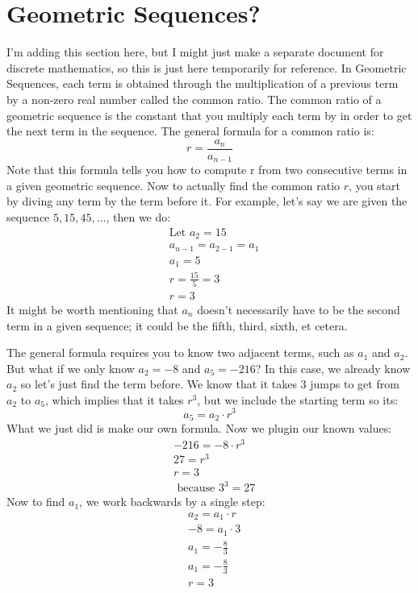 \documentclass[12pt, letterpaper]{article}
\begin{document}
	\section{Geometric Sequences?}
	I'm adding this section here, but I might just make a separate document for discrete mathematics, so this is just here temporarily for reference.
	In Geometric Sequences, each term is obtained through the multiplication of a previous term by a non-zero real number called the common ratio. The common ratio of a geometric sequence is the constant that you multiply each term by in order to get the next term in the sequence. The general formula for a common ratio is:
	\begin{equation*}
		r = \frac{a_n}{a_{n-1}}
	\end{equation*}
	Note that this formula tells you how to compute r from two consecutive terms in a given geometric sequence. Now to actually find the common ratio \(r\), you start by diving any term by the term before it. For example, let's say we are given the sequence \(5, 15, 45,...\), then we do:
	\begin{equation*}
	\begin{split}
		&\text{Let } a_{2} = 15 \\
		&a_{n-1} = a_{2-1} = a_{1} \\
		&a_{1} = 5 \\
		&r = \frac{15}{5} = 3 \\
		&r = 3
	\end{split}
	\end{equation*}
	It might be worth mentioning that \(a_n\) doesn't necessarily have to be the second term in a given sequence; it could be the fifth, third, sixth, et cetera.
	
	The general formula requires you to know two adjacent terms, such as \( a_1\) and \(a_2 \). But what if we only know \(a_2 = -8\) and \(a_5 = -216\)? In this case, we already know \(a_2\) so let's just find the term before. We know that it takes 3 jumps to get from \(a_2\) to \(a_5\), which implies that it takes \(r^{3}\), but we include the starting term so its:
	\begin{equation*}
	a_{5}=a_{2} \cdot r^{3}
	\end{equation*}
	What we just did is make our own formula. Now we plugin our known values:
	\begin{equation*}
	\begin{split}
	&-216 = -8 \cdot r^3 \\
	&27 = r^3 \\
	&r = 3 \\
	&\text{ because } 3^3 = 27
	\end{split}
	\end{equation*}
	Now to find \(a_1\), we work backwards by a single step:
	\begin{equation*}
	\begin{split}
	&a_2 = a_1 \cdot r \\
	&-8 = a_1 \cdot 3 \\
	&a_1 = -\frac{8}{3} \\
	&a_1 = -\frac{8}{3} \\
	&r = 3
	\end{split}
	\end{equation*}
	
\end{document}
